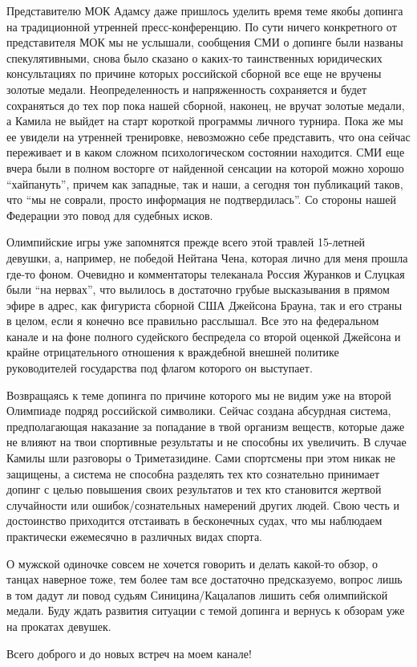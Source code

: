 Представителю МОК Адамсу даже пришлось уделить время теме якобы допинга на
традиционной утренней пресс-конференцию. По сути ничего конкретного от
представителя МОК мы не услышали, сообщения СМИ о допинге были названы
спекулятивными, снова было сказано о каких-то таинственных юридических
консультациях по причине которых российской сборной все еще не вручены золотые
медали. Неопределенность и напряженность сохраняется и будет сохраняться до тех
пор пока нашей сборной, наконец, не вручат золотые медали, а Камила не выйдет
на старт короткой программы личного турнира. Пока же мы ее увидели на утренней
тренировке, невозможно себе представить, что она сейчас переживает и в каком
сложном психологическом состоянии находится. СМИ еще вчера были в полном
восторге от найденной сенсации на которой можно хорошо \enquote{хайпануть}, причем как
западные, так и наши, а сегодня тон публикаций таков, что \enquote{мы не соврали,
просто информация не подтвердилась}. Со стороны нашей Федерации это повод для
судебных исков.

Олимпийские игры уже запомнятся прежде всего этой травлей 15-летней девушки, а,
например, не победой Нейтана Чена, которая лично для меня прошла где-то фоном.
Очевидно и комментаторы телеканала Россия Журанков и Слуцкая были \enquote{на нервах},
что вылилось в достаточно грубые высказывания в прямом эфире в адрес, как
фигуриста сборной США Джейсона Брауна, так и его страны в целом, если я конечно
все правильно расслышал. Все это на федеральном канале и на фоне полного
судейского беспредела со второй оценкой Джейсона и крайне отрицательного
отношения к враждебной внешней политике руководителей государства под флагом
которого он выступает.

Возвращаясь к теме допинга по причине которого мы не видим уже на второй
Олимпиаде подряд российской символики. Сейчас создана абсурдная система,
предполагающая наказание за попадание в твой организм веществ, которые даже не
влияют на твои спортивные результаты и не способны их увеличить. В случае
Камилы шли разговоры о Триметазидине. Сами спортсмены при этом никак не
защищены, а система не способна разделять тех кто сознательно принимает допинг
с целью повышения своих результатов и тех кто становится жертвой случайности
или ошибок/сознательных намерений других людей. Свою честь и достоинство
приходится отстаивать в бесконечных судах, что мы наблюдаем практически
ежемесячно в различных видах спорта.

О мужской одиночке совсем не хочется говорить и делать какой-то обзор, о танцах
наверное тоже, тем более там все достаточно предсказуемо, вопрос лишь в том
дадут ли повод судьям Синицина/Кацалапов лишить себя олимпийской медали. Буду
ждать развития ситуации с темой допинга и вернусь к обзорам уже на прокатах
девушек.

Всего доброго и до новых встреч на моем канале!
